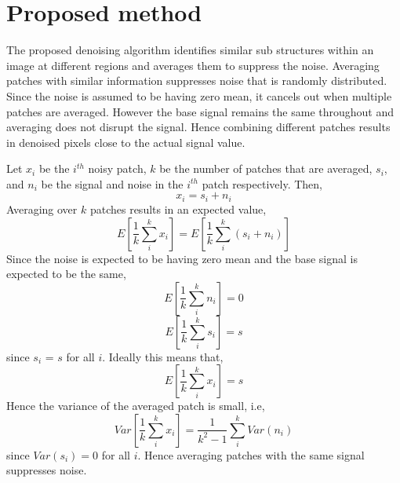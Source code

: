 \documentclass[fleqn,10pt]{wlscirep}
\begin{document}
\section*{Proposed method}

The proposed denoising algorithm identifies similar sub structures within an image at different regions and averages them to suppress the noise. Averaging patches with similar information suppresses noise that is randomly distributed. Since the noise is assumed to be having zero mean, it cancels out when multiple patches are averaged. However the base signal remains the same throughout and averaging does not disrupt the signal. Hence combining different patches results in denoised pixels close to the actual signal value. 

Let $x_{i}$ be the $i^{th}$ noisy patch, $k$ be the number of patches that are averaged, $s_i$, and $n_i$ be the signal and noise in the $i^{th}$ patch respectively. Then,
\begin{equation}
	x_i = s_i + n_i
\end{equation}
Averaging over $k$ patches results in an expected value,
\begin{equation}
	E[\frac{1}{k}\sum_{i}^{k}x_i ] = E[\frac{1}{k}\sum_{i}^{k}(s_i + n_i) ]
\end{equation}
Since the noise is expected to be having zero mean and the base signal is expected to be the same,
\begin{equation}
	E[\frac{1}{k}\sum_{i}^{k}n_i ] = 0
\end{equation}
\begin{equation}
	E[\frac{1}{k}\sum_{i}^{k}s_i ] = s
\end{equation}
since $s_i$ = $s$ for all $i$. Ideally this means that,
\begin{equation}
	E[\frac{1}{k}\sum_{i}^{k}x_i ] = s
\end{equation}
Hence the variance of the averaged patch is small, i.e,
\begin{equation}
	Var[\frac{1}{k}\sum_{i}^{k}x_i ] = \frac{1}{k^2 -1} \sum_{i}^{k}Var(n_i)
\end{equation}
since $Var(s_i) = 0$ for all $i$. Hence averaging patches with the same signal suppresses noise.

\end{document}
